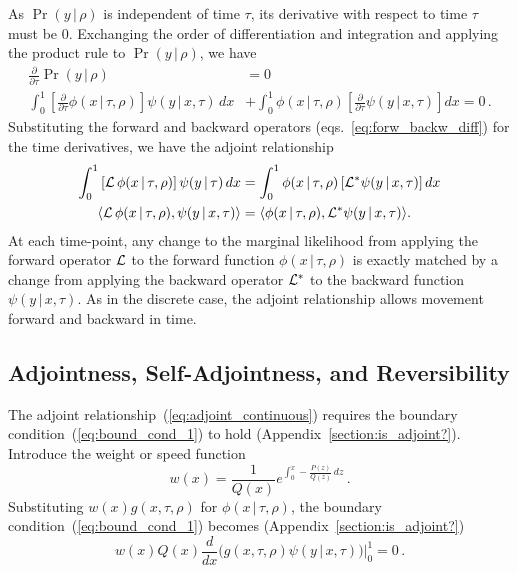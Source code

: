 \documentclass[preprint]{elsarticle}
\newcommand\given{{\,|\,}}
\newcommand\eg{{\it e.g.,}}
\newcommand\y{\ensuremath{y}}
\begin{document}
As $\Pr(\y\given\rho)$ is independent of time $\tau$, its derivative with respect to time $\tau$ must be $0$. Exchanging the order of differentiation and integration and applying the product rule to $\Pr(\y\given\rho)$, we have 
\begin{equation}\label{eq:time_trick}
\begin{split}
 \frac{\partial}{\partial\tau} \Pr(y\given \rho) &= 0\\
\int_{0}^{1} \left[\frac{\partial}{\partial\tau} \phi(x\given\tau,\rho)\right] \psi(\y\given x,\tau)\,dx &+\int_{0}^{1} \phi(x\given\tau,\rho) \left[\frac{\partial}{\partial\tau} \psi(\y\given x,\tau)\right] dx=0\,.
\end{split}
\end{equation}
Substituting the forward and backward operators (eqs.~\ref{eq:forw_backw_diff}) for the time derivatives, we have the adjoint relationship
\begin{equation}\label{eq:adjoint_continuous}
\begin{split}
\int_{0}^{1} \left[{\cal L}\,\phi(x\given\tau,\rho)\right] \psi(\y\given \tau)\,dx &= \int_{0}^{1}  \phi(x\given\tau,\rho) \left[{\cal L}^{*} \psi(\y\given x,\tau)\right] dx\\
\langle{\cal L}\,\phi(x\given\tau,\rho), \psi(\y\given x,\tau)\rangle &= \langle \phi(x\given\tau,\rho),{\cal L}^{*} \psi(\y\given x,\tau)\rangle.
\end{split}
\end{equation}
 At each time-point, any change to the marginal likelihood from applying the forward operator ${\cal L}$ to the forward function $\phi(x\given\tau,\rho)$ is exactly matched by a change from applying the backward operator ${\cal L}^{*}$ to the backward function $\psi(\y\given x,\tau)$. As in the discrete case, the adjoint relationship allows movement forward and backward in time. 
 
\subsection{Adjointness, Self-Adjointness, and Reversibility}

The adjoint relationship~(\ref{eq:adjoint_continuous}) requires the boundary condition~(\ref{eq:bound_cond_1}) to hold (Appendix~\ref{section:is_adjoint?}). Introduce the weight or speed function \citep[\eg][]{Ewen04,Song12}
\begin{equation}\label{eq:weight_function}
    w(x)=\frac1{Q(x)}e^{\int_0^x -\frac{P(z)}{Q(z)}\,dz}\,.
\end{equation}
Substituting  $w(x)g(x,\tau,\rho)$ for $\phi(x\given\tau,\rho)$, the boundary condition~(\ref{eq:bound_cond_1}) becomes (Appendix~\ref{section:is_adjoint?})
\begin{equation}\label{eq:bound_cond}
w(x)Q(x)\frac{d}{d x}\bigg(g(x,\tau,\rho)\psi(\y\given x,\tau)\bigg)\bigg|_0^1=0\,.
\end{equation}
\end{document}

